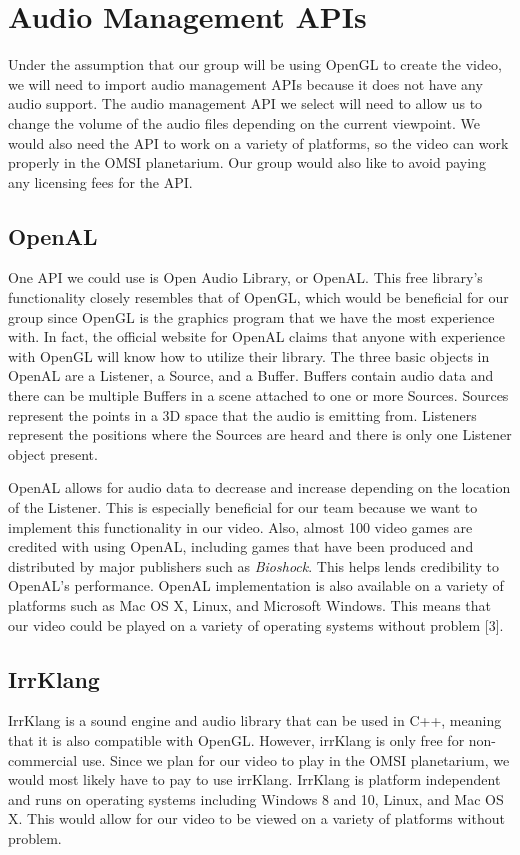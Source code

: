 \documentclass[onecolumn, draftclsnofoot,10pt, compsoc]{IEEEtran}
\begin{document}
\section{Audio Management APIs}
Under the assumption that our group will be using OpenGL to create the video, we will need to import audio management APIs because it does not have any audio support. The audio management API we select will need to allow us to change the volume of the audio files depending on the current viewpoint. We would also need the API to work on a variety of platforms, so the video can work properly in the OMSI planetarium. Our group would also like to avoid paying any licensing fees for the API.

\subsection{OpenAL}
One API we could use is Open Audio Library, or OpenAL. This free library's functionality closely resembles that of OpenGL, which would be beneficial for our group since OpenGL is the graphics program that we have the most experience with. In fact, the official website for OpenAL claims that anyone with experience with OpenGL will know how to utilize their library. The three basic objects in OpenAL are a Listener, a Source, and a Buffer. Buffers contain audio data and there can be multiple Buffers in a scene attached to one or more Sources. Sources represent the points in a 3D space that the audio is emitting from. Listeners represent the positions where the Sources are heard and there is only one Listener object present.


OpenAL allows for audio data to decrease and increase depending on the location of the Listener. This is especially beneficial for our team because we want to implement this functionality in our video. Also, almost 100 video games are credited with using OpenAL, including games that have been produced and distributed by major publishers such as \textit{Bioshock}. This helps lends credibility to OpenAL's performance. OpenAL implementation is also available on a variety of platforms such as Mac OS X, Linux, and Microsoft Windows. This means that our video could be played on a variety of operating systems without problem [3].


\subsection{IrrKlang}
IrrKlang is a sound engine and audio library that can be used in C++, meaning that it is also compatible with OpenGL. However, irrKlang is only free for non-commercial use. Since we plan for our video to play in the OMSI planetarium, we would most likely have to pay to use irrKlang. IrrKlang is platform independent and runs on operating systems including Windows 8 and 10, Linux, and Mac OS X. This would allow for our video to be viewed on a variety of platforms without problem. 
\end{document}
